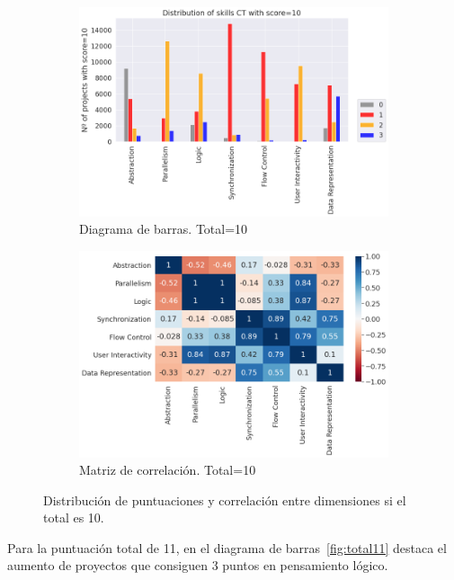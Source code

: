 \documentclass[a4paper, 12pt]{book}
\begin{document}
\begin{figure}
    \centering
    \begin{subfigure}[h]{.49\textwidth} 
        \includegraphics[width=\textwidth]{img/distribucion_10_Scratch}
        \caption{Diagrama de barras. Total=10}
        \label{fig:total10}
    \end{subfigure}       
    \begin{subfigure}[h]{.49\textwidth} 
        \includegraphics[width=\textwidth]{img/corr_10_Scratch}
        \caption{Matriz de correlación. Total=10}
        \label{fig:corr10}
    \end{subfigure}
     \caption{Distribución de puntuaciones y correlación entre dimensiones si el total es 10.}
\end{figure}

Para la puntuación total de 11, en el diagrama de barras~\ref{fig:total11} destaca el aumento de proyectos que consiguen 3 puntos en pensamiento lógico.
\end{document}
